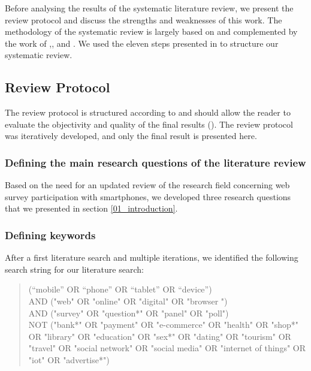 Before analysing the results of the systematic literature review, we present the review protocol and discuss the strengths and weaknesses of this work. The methodology of the systematic review is largely based on \cite{silva_systematic_2016} and complemented by the work of \cite{xiao_guidance_2017},\cite{petticrew_systematic_2008},\cite{snyder_literature_2019} and \cite{denyer_producing_2009}. We used the eleven steps presented in \cite{silva_systematic_2016} to structure our systematic review.

\subsection{Review Protocol}

The review protocol is structured according to \cite{silva_systematic_2016} and should allow the reader to evaluate the objectivity and quality of the final results (\cite{page_prisma_2021}). The review protocol was iteratively developed, and only the final result is presented here.


\subsubsection{Defining the main research questions of the literature review}

Based on the need for an updated review of the research field concerning web survey participation with smartphones, we developed three research questions that we presented in section \ref{01_introduction}.

\subsubsection{Defining keywords}
\label{subsubsec: Defining search string}

After a first literature search and multiple iterations, we identified the following search string for our literature search: \\

\begin{quote}
(“mobile” OR “phone” OR “tablet” OR “device”) \\

AND ("web" OR "online" OR "digital" OR "browser ")  \\
    
AND ("survey" OR "question*" OR "panel" OR "poll")  \\
    
NOT ("bank*" OR "payment" OR "e-commerce" OR "health" OR "shop*" OR "library" OR "education" OR "sex*" OR "dating" OR "tourism" OR "travel" OR "social network" OR "social media" OR "internet of things" OR "iot" OR "advertise*")\\
\end{quote}

